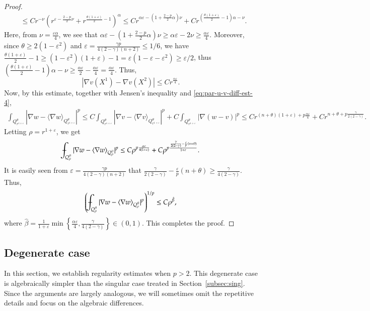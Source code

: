 \documentclass[11pt,oneside,english]{amsart}
\newcommand{\e}{\varepsilon}
\newcommand{\al}{\alpha}
\newcommand{\be}{\beta}
\newcommand{\D}{\nabla}
\numberwithin{equation}{section}
\def\Xint#1{\mathchoice
  {\XXint\displaystyle\textstyle{#1}}%
  {\XXint\textstyle\scriptstyle{#1}}%
  {\XXint\scriptstyle\scriptscriptstyle{#1}}%
  {\XXint\scriptscriptstyle\scriptscriptstyle{#1}}%
  \!\int}
\def\XXint#1#2#3{{\setbox0=\hbox{$#1{#2#3}{\int}$}
    \vcenter{\hbox{$#2#3$}}\kern-.5\wd0}}
\def\dashint{\Xint-}
\theoremstyle{plain}
\numberwithin{equation}{section}
\newcommand{\mean}[1]{\langle{#1}\rangle}
\begin{document}
\begin{proof}
\begin{align*}
    &\le Cr^{-\nu}\left(r^{\e-\frac{2-p}2\nu}+r^{\frac{\theta(1+\e)}{2}-1} \right)^{\al}\le Cr^{\al\e-\left(1+\frac{2-p}2\al\right)\nu }+Cr^{\left(\frac{\theta(1+\e)}2-1\right)\al-\nu}. 
\end{align*}
Here, from $\nu=\frac{\e\al}4$, we see that $\al\e-\left(1+\frac{2-p}2\al\right)\nu\ge \al\e-2\nu\ge\frac{\al\e}4$. Moreover, since $\theta\ge2(1-\e^2)$ and $\e=\frac{\gamma p}{4(2-\gamma)(n+2)}\le 1/6$, we have $\frac{\theta(1+\e)}2-1\ge (1-\e^2)(1+\e)-1=\e(1-\e-\e^2)\ge\e/2$, thus $\left(\frac{\theta(1+\e)}2-1\right)\al-\nu\ge\frac{\al\e}2-\frac{\al\e}4=\frac{\al\e}4$. Thus,
$$
|\D v(X^1)-\D v(X^2)|\le Cr^{\frac{\al\e}4}.
$$
Now, by this estimate, together with Jensen's inequality and \eqref{eq:par-u-v-diff-est-4}, 
\begin{align*}
    \int_{Q^\theta_{r^{1+\e}}}|\D w-\mean{\D w}_{Q^\theta_{r^{1+\e}}}|^p\le C\int_{Q_{r^{1+\e}}^\theta}|\D v-\mean{\D v}_{Q^\theta_{r^{1+\e}}}|^p+C\int_{Q_{r^{1+\e}}^\theta}|\D(w-v)|^p\le Cr^{(n+\theta)(1+\e)+p\frac{\al\e}{4}}+Cr^{n+\theta+p\frac{\gamma}{2(2-\gamma)}}.
\end{align*}
Letting $\rho=r^{1+\e}$, we get
\begin{align*}
    \dashint_{Q_\rho^\theta}|\D w-\mean{\D w}_{Q_\rho^\theta}|^p\le C\rho^{p\frac{\al\e}{4(1+\e)}}+C\rho^{p\frac{\frac{\gamma}{2(2-\gamma)}-\frac{\e}p(n+\theta) }{1+\e}}.
\end{align*}
It is easily seen from $\e=\frac{\gamma p}{4(2-\gamma)(n+2)}$ that $\frac{\gamma}{2(2-\gamma)}-\frac{\e}p(n+\theta)\ge\frac{\gamma}{4(2-\gamma)}$. Thus,
\begin{align*}
    \left(\dashint_{Q_\rho^\theta}|\D w-\mean{\D w}_{Q^\theta_\rho}|^p\right)^{1/p}\le C\rho^{\hat\be},
\end{align*}
where $\hat\be=\frac1{1+\e}\min\left\{\frac{\al\e}4,\frac{\gamma}{4(2-\gamma)} \right\}\in(0,1)$. This completes the proof.
\end{proof}


\subsection{Degenerate case}\label{subsec:deg}
In this section, we establish regularity estimates when $p>2$. This degenerate case is algebraically simpler than the singular case treated in Section~\ref{subsec:sing}. Since the arguments are largely analogous, we will sometimes omit the repetitive details and focus on the algebraic differences.
\end{document}
